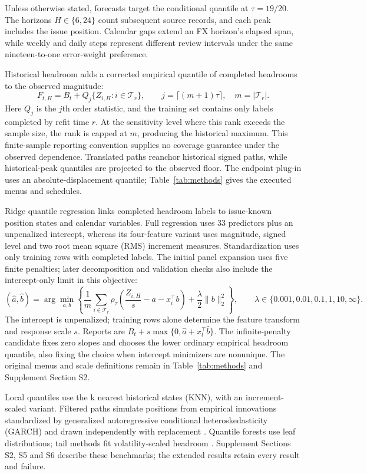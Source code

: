 \documentclass[12pt,a4paper]{article}
\begin{document}
Unless otherwise stated, forecasts target the conditional quantile at \(\tau=19/20\). The horizons \(H\in\{6,24\}\) count subsequent source records, and each peak includes the issue position. Calendar gaps extend an FX horizon's elapsed span, while weekly and daily steps represent different review intervals under the same nineteen-to-one error-weight preference.

Historical headroom adds a corrected empirical quantile of completed headrooms to the observed magnitude:
\[
F_{t,H}=B_t+Q_j\{Z_{i,H}:i\in\mathcal T_r\},\qquad
j=\lceil(m+1)\tau\rceil,\quad m=|\mathcal T_r|.
\]
Here \(Q_j\) is the \(j\)th order statistic, and the training set contains only labels completed by refit time \(r\).
At the sensitivity level where this rank exceeds the sample size, the rank is capped at \(m\), producing the historical maximum.
This finite-sample reporting convention supplies no coverage guarantee under the observed dependence. Translated paths reanchor historical signed paths, while historical-peak quantiles are projected to the observed floor. The endpoint plug-in uses an absolute-displacement quantile; Table~\ref{tab:methods} gives the executed menus and schedules.

Ridge quantile regression links completed headroom labels to issue-known position states and calendar variables. Full regression uses 33 predictors plus an unpenalized intercept, whereas its four-feature variant uses magnitude, signed level and two root mean square (RMS) increment measures. Standardization uses only training rows with completed labels. The initial panel expansion uses five finite penalties; later decomposition and validation checks also include the intercept-only limit in this objective:
\[
(\hat a,\hat b)=\arg\min_{a,b}\left\{
\frac1m\sum_{i\in\mathcal T_r}\rho_\tau\!\left(\frac{Z_{i,H}}s-a-x_i^\top b\right)
+\frac\lambda2\|b\|_2^2\right\},\qquad
\lambda\in\{0.001,0.01,0.1,1,10,\infty\}.
\]
The intercept is unpenalized; training rows alone determine the feature transform and response scale \(s\).
Reports are \(B_t+s\max\{0,\hat a+x_t^\top\hat b\}\). The infinite-penalty candidate fixes zero slopes and chooses the lower ordinary empirical headroom quantile, also fixing the choice when intercept minimizers are nonunique.
The original menus and scale definitions remain in Table~\ref{tab:methods} and Supplement Section S2.

Local quantiles use the k nearest historical states (KNN), with an increment-scaled variant. Filtered paths simulate positions from empirical innovations standardized by generalized autoregressive conditional heteroskedasticity (GARCH) and drawn independently with replacement \cite{hull1998,barone1999}. Quantile forests use leaf distributions; tail methods fit volatility-scaled headroom \cite{meinshausen2006,mcneilfrey2000}. Supplement Sections S2, S5 and S6 describe these benchmarks; the extended results retain every result and failure.
\end{document}

